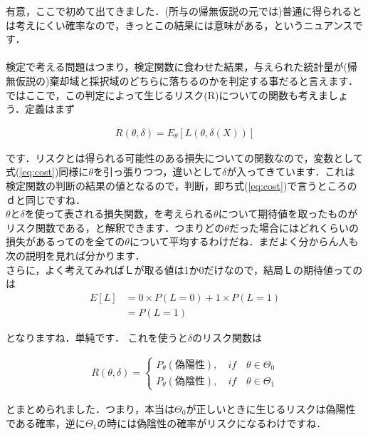 \documentclass[11pt,a4paper,uplatex]{ujreport} 	%
\begin{document}
有意，ここで初めて出てきました．(所与の帰無仮説の元では)普通に得られるとは考えにくい確率なので，きっとこの結果には意味がある，というニュアンスです．\\
\\

検定で考える問題はつまり，検定関数に食わせた結果，与えられた統計量が(帰無仮説の)棄却域と採択域のどちらに落ちるのかを判定する事だると言えます．\\

ではここで，この判定によって生じるリスク(R)についての関数も考えましょう．定義はまず

\begin{align}
  R(\theta, \delta) = E_\theta[L(\theta, \delta(X))]
\end{align}

です．リスクとは得られる可能性のある損失についての関数なので，変数として式(\ref{eq:cost})同様に$\theta$を引っ張りつつ，違いとして$\delta$が入ってきています．これは検定関数の判断の結果の値となるので，判断，即ち式(\ref{eq:cost})で言うところのｄと同じですね．\\

$\theta$と$\delta$を使って表される損失関数，を考えられる$\theta$について期待値を取ったものがリスク関数である，と解釈できます．つまりどの$\theta$だった場合にはどれくらいの損失があるってのを全ての$\theta$について平均するわけだね．まだよく分からん人も次の説明を見れば分かります．\\

さらに，よく考えてみればＬが取る値は1か0だけなので，結局Ｌの期待値ってのは
\begin{align}
  E[L] &= 0 \times P(L=0) + 1 \times P(L=1)\\
       &= P(L=1)
\end{align}

となりますね．単純です．
これを使うと$\delta$のリスク関数は

\begin{align}
  R(\theta, \delta) = 
  \left\{
    \begin{array}{l}
    P_\theta(偽陽性), \quad if \quad \theta \in \Theta_0\\
    P_\theta(偽陰性), \quad if \quad \theta \in \Theta_1
    \end{array}
  \right.
  \label{eq:risk}
\end{align}

とまとめられました．つまり，本当は$\Theta_0$が正しいときに生じるリスクは偽陽性である確率，逆に$\Theta_1$の時には偽陰性の確率がリスクになるわけですね．\\
\end{document}
